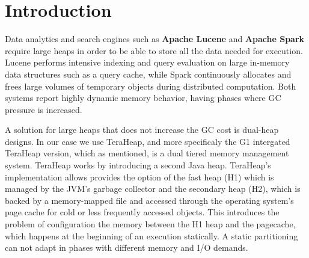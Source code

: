 \section{Introduction}



Data analytics and search engines such as \textbf{Apache Lucene}
\cite{klinaftakis2025thesis} and \textbf{Apache Spark} require large heaps in order 
to be able to store all the data needed for execution. Lucene performs intensive indexing and query
evaluation on large in-memory data structures such as a query cache, while
Spark continuously allocates and frees large volumes of temporary objects
during distributed computation. Both systems report highly dynamic memory
behavior, having phases where GC pressure is increased.

A solution for large heaps that does not increase the GC cost is dual-heap designs.
In our case we use TeraHeap, and more specificaly the G1 intergated TeraHeap version, which as mentioned, is a dual
tiered memory management system. TeraHeap works by introducing a second Java heap. TeraHeap's implementation
allows provides the option of the fast heap (H1) which is managed by the JVM's garbage collector and the secondary heap (H2), which is
backed by a memory-mapped file and accessed through the operating system's page cache for cold or less frequently accessed objects.
This introduces the problem of configuration the memory between the H1 heap and the pagecache, which happens at the beginning of an execution statically.
A static partitioning can not adapt in phases with different memory and I/O demands. 

